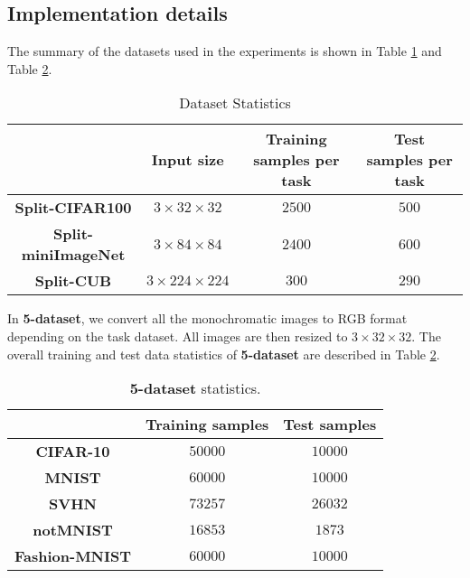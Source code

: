 \documentclass{article} \usepackage{collas2022_conference,times}
\begin{document}
\subsection{Implementation details}\label{exp_details}

The summary of the datasets used in the experiments is shown in Table \ref{data_stats} and Table \ref{5data_stats}.
    
\begin{table}[h!]
    \caption{Dataset Statistics}
    \vskip 0.1in
    \centering
    \begin{tabular}{c c c c}
        \hline
        & \textbf{Input size} & \textbf{Training samples per task} & \textbf{Test samples per task} \\
        \hline
        \textbf{Split-CIFAR100} & $3\times32\times32$ & $2500$ & $500$ \\
        \textbf{Split-miniImageNet} & $3\times84\times84$ & $2400$ & $600$ \\
        \textbf{Split-CUB}  & $3\times224\times224$ & $300$ & $290$ \\
        \hline
    \end{tabular}
    \label{data_stats}
\end{table}    
    


In \textbf{5-dataset}, we convert all the monochromatic images to RGB format depending on the task dataset. All images are then resized to $3\times32\times32$. The overall training and test data statistics of \textbf{5-dataset} are described in Table \ref{5data_stats}.

\begin{table}[h!]
    \caption{\textbf{5-dataset} statistics.}
    \vskip 0.1in
    \centering
    \begin{tabular}{c c c}
        \hline
        & \textbf{Training samples} & \textbf{Test samples} \\
        \hline
        \textbf{CIFAR-10}  & $50000$ & $10000$ \\
        \textbf{MNIST}  & $60000$ & $10000$ \\
        \textbf{SVHN}  & $73257$ & $26032$ \\
        \textbf{notMNIST}  & $16853$ & $1873$ \\
        \textbf{Fashion-MNIST} & $60000$ & $10000$ \\
        \hline
    \end{tabular}\label{5data_stats}
\end{table}
\end{document}
